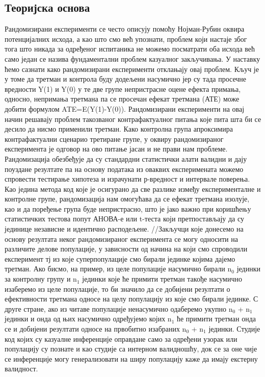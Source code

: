 \documentclass[12pt, a4paper]{article}
\begin{document}
\subsection{Теоријска основа}


Рандомизирани експерименти се често описују помоћу Нојман-Рубин оквира потенцијалних исхода, 
а као што смо већ упознати, проблем који настаје због тога што никада за 
одређеног испитаника не можемо посматрати оба исхода већ само један се назива фундаментални 
проблем казуалног закључивања. У наставку ћемо сазнати како рандомизирани експерименти 
отклањају овај проблем. Кључ је у томе да третман и контрола буду додељени насумично јер су тада 
просечне вредности Y(1) и Y(0) у те две групе непристрасне оцене ефекта примања, односно, 
непримања третмана па се просечан ефекат третмана (АТЕ) може добити формулом ATE=E(Y(1)-Y(0)).
Рандомизирани експерименти на овај начин решавају проблем такозваног контрафактуалног питања које 
пита шта би се десило да нисмо применили третман. Како контролна група апроксимира контрафактуални 
сценарио третиране групе, у оквиру рандомизираног експеримента је одговор на ово питање јасан и 
не прави нам проблеме. Рандомизација обезбеђује да су стандардни статистички алати валидни и дају 
поуздане резултате па на основу података из оваквих експеримената можемо спровести тестирање 
хипотеза и израчунати р-вредност и интервале поверења. Као једина метода код које је осигурано да 
све разлике између експерименталне и контролне групе, рандомизација нам омогућава да се ефекат 
третмана изолује, као и да поређење група буде непристрасно, што је јако важно при коришћењу 
статистичких тестова попут АНОВА-е или t-теста који претпостављају да су јединице независне и 
идентично расподељене.
//Закључци које донесемо на основу резултата неког рандомизираног експеримента се могу односити на 
различите делове популације, у зависности од начина на који смо спроводили експеримент тј из које 
суперпопулације смо бирали јединке којима дајемо третман. Ако бисмо, на пример, из целе популације 
насумично бирали n$_0$ јединки за контролну групу и n$_1$ јединки које ће примити третман такође 
насумично изаберемо из целе популације, то би значило да се добијени резултати о ефективности 
третмана односе на целу популацију из које смо бирали јединке.
С друге стране, ако из читаве популације ненасумично одаберемо укупно n$_0$ + n$_1$ јединки и онда 
од њих насумично одређујемо којих n$_1$ ће примити третман онда се и добијени резултати односе на 
првобитно изабраних n$_0$ + n$_1$ јединки. Студије код којих су казуалне инференције оправдане 
само за одређени узорак или популацију су познате и као студије са интерном валидношћу, док се за 
оне чије се инференције могу генерализовати на ширу популацију каже да имају екстерну валидност.
\end{document}

